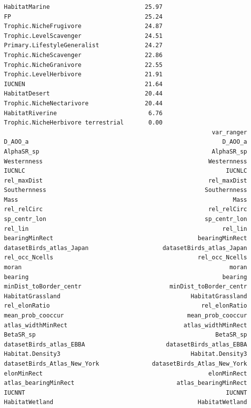\documentclass[
  letterpaper,
  DIV=11,
  numbers=noendperiod]{scrreprt}
\begin{document}
\begin{verbatim}
HabitatMarine                           25.97
FP                                      25.24
Trophic.NicheFrugivore                  24.87
Trophic.LevelScavenger                  24.51
Primary.LifestyleGeneralist             24.27
Trophic.NicheScavenger                  22.86
Trophic.NicheGranivore                  22.55
Trophic.LevelHerbivore                  21.91
IUCNEN                                  21.64
HabitatDesert                           20.44
Trophic.NicheNectarivore                20.44
HabitatRiverine                          6.76
Trophic.NicheHerbivore terrestrial       0.00
                                                           var_ranger
D_AOO_a                                                       D_AOO_a
AlphaSR_sp                                                 AlphaSR_sp
Westernness                                               Westernness
IUCNLC                                                         IUCNLC
rel_maxDist                                               rel_maxDist
Southernness                                             Southernness
Mass                                                             Mass
rel_relCirc                                               rel_relCirc
sp_centr_lon                                             sp_centr_lon
rel_lin                                                       rel_lin
bearingMinRect                                         bearingMinRect
datasetBirds_atlas_Japan                     datasetBirds_atlas_Japan
rel_occ_Ncells                                         rel_occ_Ncells
moran                                                           moran
bearing                                                       bearing
minDist_toBorder_centr                         minDist_toBorder_centr
HabitatGrassland                                     HabitatGrassland
rel_elonRatio                                           rel_elonRatio
mean_prob_cooccur                                   mean_prob_cooccur
atlas_widthMinRect                                 atlas_widthMinRect
BetaSR_sp                                                   BetaSR_sp
datasetBirds_atlas_EBBA                       datasetBirds_atlas_EBBA
Habitat.Density3                                     Habitat.Density3
datasetBirds_Atlas_New_York               datasetBirds_Atlas_New_York
elonMinRect                                               elonMinRect
atlas_bearingMinRect                             atlas_bearingMinRect
IUCNNT                                                         IUCNNT
HabitatWetland                                         HabitatWetland

\end{verbatim}
\end{document}
